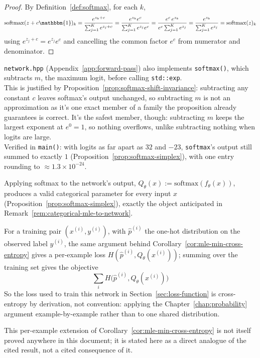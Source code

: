		\begin{proof}
			By Definition~\ref{def:softmax}, for each $k$,
			\[
				\mathrm{softmax}(z+c\mathbbm{1})_k = \frac{e^{z_k+c}}{\sum_{j=1}^Ke^{z_j+c}} = \frac{e^{z_k}e^c}{\sum_{j=1}^Ke^{z_j}e^c} = \frac{e^c\, e^{z_k}}{e^c\sum_{j=1}^Ke^{z_j}} = \frac{e^{z_k}}{\sum_{j=1}^Ke^{z_j}} = \mathrm{softmax}(z)_k
			\]
			using $e^{z_j+c}=e^{z_j}e^c$ and cancelling the common factor $e^c$ from numerator and denominator.
		\end{proof}
		
		\begin{compremark}
			\texttt{network.hpp} (Appendix~\ref{app:forward-pass}) also implements \texttt{softmax()}, which subtracts $m$, the maximum logit, before calling \texttt{std::exp}. \\
			
			This is justified by Proposition~\ref{prop:softmax-shift-invariance}: subtracting any constant $c$ leaves softmax's output unchanged, so subtracting $m$ is not an approximation as it's one exact member of a family the proposition already guarantees is correct. It's the safest member, though: subtracting $m$ keeps the largest exponent at $e^0=1$, so nothing overflows, unlike subtracting nothing when logits are large. \\
			
			Verified in \texttt{main()}: with logits as far apart as $32$ and $-23$, \texttt{softmax}'s output still summed to exactly $1$ (Proposition~\ref{prop:softmax-simplex}), with one entry rounding to $\approx1.3\times10^{-24}$.
		\end{compremark}
		
		\begin{remark}
			\label{rem:network-loss-preview}
			Applying softmax to the network's output, $Q_\theta(x):=\mathrm{softmax}(f_\theta(x))$, produces a valid categorical parameter for every input $x$ (Proposition~\ref{prop:softmax-simplex}), exactly the object anticipated in Remark~\ref{rem:categorical-mle-to-network}.
			
			For a training pair $(x^{(i)},y^{(i)})$, with $\hat p^{(i)}$ the one-hot distribution on the observed label $y^{(i)}$, the same argument behind Corollary~\ref{cor:mle-min-cross-entropy} gives a per-example loss $H(\hat p^{(i)},Q_\theta(x^{(i)}))$; summing over the training set gives the objective
			\[
				\sum_i H\big(\hat p^{(i)}, Q_\theta(x^{(i)})\big)
			\]
			So the loss used to train this network in Section~\ref{sec:loss-function} is cross-entropy by derivation, not convention: applying the Chapter~\ref{chap:probability} argument example-by-example rather than to one shared distribution.
			
			This per-example extension of Corollary~\ref{cor:mle-min-cross-entropy} is not itself proved anywhere in this document; it is stated here as a direct analogue of the cited result, not a cited consequence of it.
		\end{remark}
	
